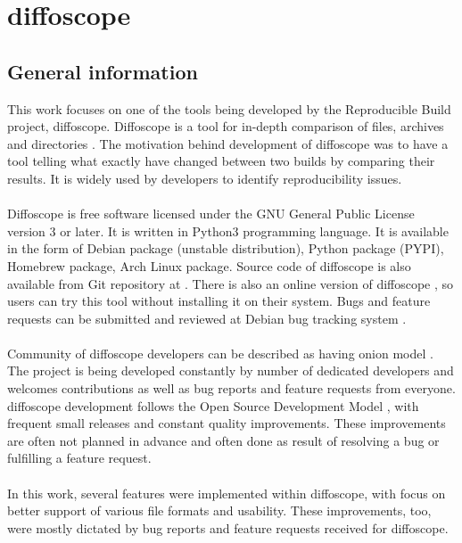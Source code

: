 \section{diffoscope}

\subsection[General information]{General information}
This work focuses on one of the tools being developed by the
Reproducible Build project, diffoscope.
Diffoscope is a tool for in-depth comparison of files, archives and
directories \autocite{dfs}.
The motivation behind development of diffoscope was to have a tool
telling what exactly have changed between two builds by comparing
their results. It is widely used by developers to identify reproducibility issues.\\\\
Diffoscope is free software licensed under the GNU General Public
License version 3 or later. It is written in Python3 programming language.
It is available in the form of Debian package (unstable distribution),
Python package (PYPI), Homebrew package, Arch Linux package. Source code
of diffoscope is also available from Git repository at \autocite{dfs-git}.
There is also an online version of diffoscope \autocite{try-dfs}, so users
can try this tool without installing it on their system.
Bugs and feature requests can be submitted and reviewed at Debian
bug tracking system \autocite{dfs-bugs}.\\\\
Community of diffoscope developers can be described as having
onion model \autocite{aberdour2007achieving}.
The project is being developed constantly by number of dedicated
developers and welcomes contributions as well as bug reports
and feature requests from everyone.
diffoscope development follows the Open Source Development Model
\autocite{osdm}, with frequent small releases and constant quality improvements.
These improvements are often not planned in advance and often
done as result of resolving a bug or fulfilling a feature request.\\\\
In this work, several features were implemented  within diffoscope,
with focus on better support of various file formats and usability.
These improvements, too, were mostly dictated by bug reports and feature requests
received for diffoscope.


